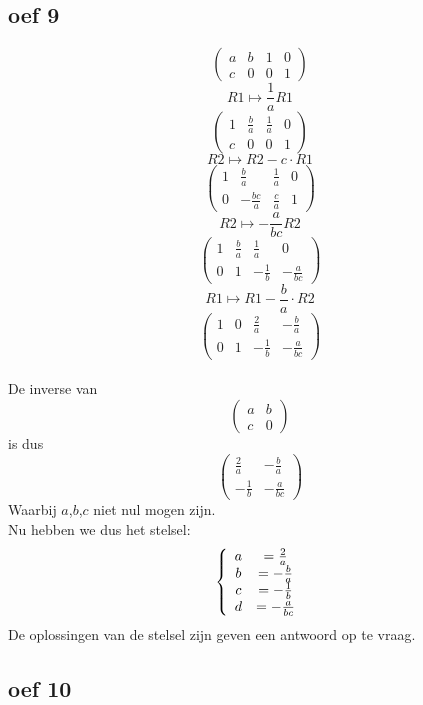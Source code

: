 \documentclass[10pt,a4paper]{article}
\begin{document}
\subsection*{oef 9}

\[
\begin{pmatrix}
a & b & 1 & 0\\
c & 0 & 0 & 1
\end{pmatrix}
\]
\[ R1 \longmapsto \frac{1}{a} R1 \]
\[
\begin{pmatrix}
1 & \frac{b}{a} & \frac{1}{a} & 0\\
c & 0 & 0 & 1
\end{pmatrix}
\]
\[ R2 \longmapsto R2 - c \cdot R1\]
\[
\begin{pmatrix}
1 & \frac{b}{a} & \frac{1}{a} & 0\\
0 & -\frac{bc}{a} & \frac{c}{a} & 1
\end{pmatrix}
\]
\[ R2 \longmapsto -\frac{a}{bc} R2 \]
\[
\begin{pmatrix}
1 & \frac{b}{a} & \frac{1}{a} & 0\\
0 & 1 & -\frac{1}{b} & -\frac{a}{bc}
\end{pmatrix}
\]
\[ R1 \longmapsto R1 - \frac{b}{a} \cdot R2\]
\[
\begin{pmatrix}
1 & 0 & \frac{2}{a} & -\frac{b}{a}\\
0 & 1 & -\frac{1}{b} & -\frac{a}{bc}
\end{pmatrix}
\]
\\De inverse van 
\[
\begin{pmatrix}
a & b\\
c & 0
\end{pmatrix}
\]
is dus
\[
\begin{pmatrix}
\frac{2}{a} & -\frac{b}{a}\\
-\frac{1}{b} & -\frac{a}{bc}
\end{pmatrix}
\]
Waarbij $a$,$b$,$c$ niet nul mogen zijn.\\
Nu hebben we dus het stelsel:
\[
\left\lbrace
\begin{array}{c c}
a &= \frac{2}{a}\\
b &= -\frac{b}{a}\\
c &= -\frac{1}{b}\\
d &= -\frac{a}{bc}
\end{array}
\right.
\]
De oplossingen van de stelsel zijn geven een antwoord op te vraag.

\subsection*{oef 10}
\end{document}
